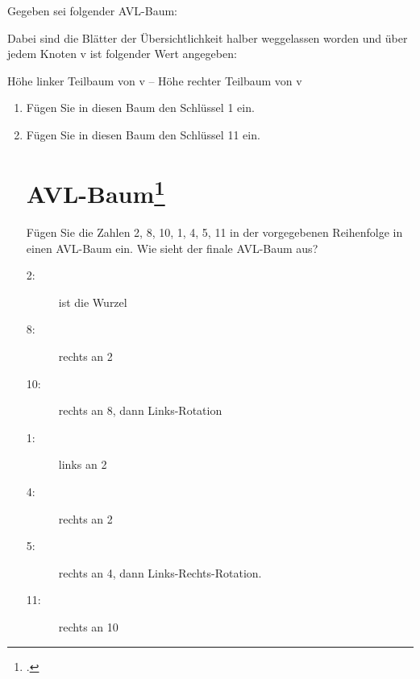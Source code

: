 \documentclass{lehramt-informatik}
\begin{document}
Gegeben sei folgender AVL-Baum:

Dabei sind die Blätter der Übersichtlichkeit halber weggelassen worden
und über jedem Knoten v ist folgender Wert angegeben:

\begin{center}
Höhe linker Teilbaum von v – Höhe rechter Teilbaum von v
\end{center}

\begin{enumerate}


\item Fügen Sie in diesen Baum den Schlüssel 1 ein.


\item Fügen Sie in diesen Baum den Schlüssel 11 ein.

\section{AVL-Baum\footcite{aud:e-klausur}}

Fügen Sie die Zahlen 2, 8, 10, 1, 4, 5, 11 in der vorgegebenen
Reihenfolge in einen AVL-Baum ein. Wie sieht der finale AVL-Baum aus?

\begin{antwort}
\begin{description}
\item[2:] ist die Wurzel
\item[8:] rechts an 2
\item[10:] rechts an 8, dann Links-Rotation
\item[1:] links an 2
\item[4:] rechts an 2
\item[5:] rechts an 4, dann Links-Rechts-Rotation.
\item[11:] rechts an 10
\end{description}

\end{antwort}

\end{enumerate}

\literatur
\end{document}
